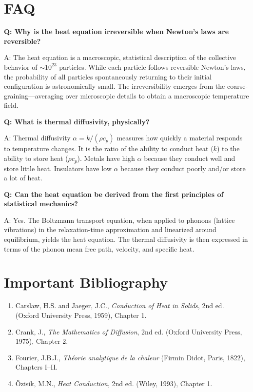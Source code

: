 \section*{FAQ}

\textbf{Q: Why is the heat equation irreversible when Newton's laws are reversible?}

A: The heat equation is a macroscopic, statistical description of the collective behavior of $\sim 10^{23}$ particles. While each particle follows reversible Newton's laws, the probability of all particles spontaneously returning to their initial configuration is astronomically small. The irreversibility emerges from the coarse-graining---averaging over microscopic details to obtain a macroscopic temperature field.

\textbf{Q: What is thermal diffusivity, physically?}

A: Thermal diffusivity $\alpha = k/(\rho c_p)$ measures how quickly a material responds to temperature changes. It is the ratio of the ability to conduct heat ($k$) to the ability to store heat ($\rho c_p$). Metals have high $\alpha$ because they conduct well and store little heat. Insulators have low $\alpha$ because they conduct poorly and/or store a lot of heat.

\textbf{Q: Can the heat equation be derived from the first principles of statistical mechanics?}

A: Yes. The Boltzmann transport equation, when applied to phonons (lattice vibrations) in the relaxation-time approximation and linearized around equilibrium, yields the heat equation. The thermal diffusivity is then expressed in terms of the phonon mean free path, velocity, and specific heat.
\section*{Important Bibliography}

\begin{enumerate}
\item Carslaw, H.S. and Jaeger, J.C., \textit{Conduction of Heat in Solids}, 2nd ed. (Oxford University Press, 1959), Chapter 1.
\item Crank, J., \textit{The Mathematics of Diffusion}, 2nd ed. (Oxford University Press, 1975), Chapter 2.
\item Fourier, J.B.J., \textit{Th\'eorie analytique de la chaleur} (Firmin Didot, Paris, 1822), Chapters I--II.
\item\"Ozisik, M.N., \textit{Heat Conduction}, 2nd ed. (Wiley, 1993), Chapter 1.
\end{enumerate}

